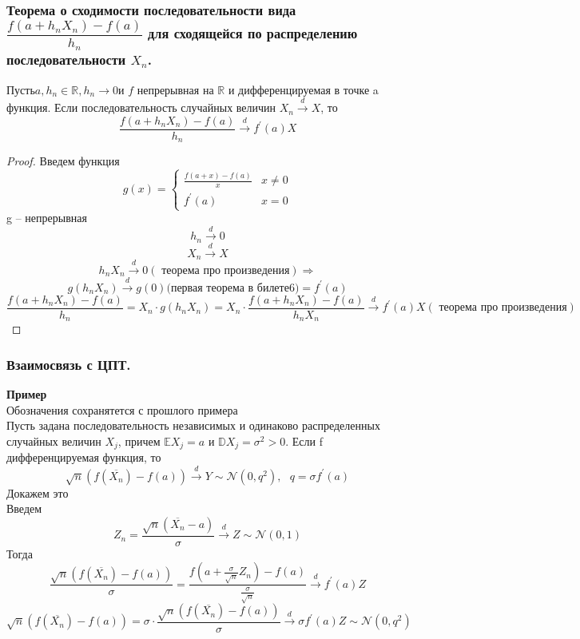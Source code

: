 	\subsubsection{Теорема о сходимости последовательности вида $\dfrac{f(a + h_n X_n) - f(a)}{h_n}$ для сходящейся по распределению последовательности $X_n$. }
	\begin{theorem*}
		Пусть$  a, h_n \in \mathbb{R}, h_n\to0 $и $ f $ непрерывная на $ \mathbb{R} $ и дифференцируемая в точке a функция. Если последовательность случайных величин $ X_n \xrightarrow{d} X $, то
		$$\frac{f(a + h_nX_n) - f(a)}{h_n}\xrightarrow{d}f^{'}(a)X$$
	\end{theorem*}
	\begin{proof}
		Введем функция
		\begin{equation*}
			g(x) = 
			\begin{cases}
				\frac{f(a + x) - f(a)}{x} & x\neq 0\\
				f^{'}(a) & x = 0
			\end{cases}
		\end{equation*}
		g -- непрерывная
		$$h_n\xrightarrow{d} 0$$
		$$X_n\xrightarrow{d}X$$
		$$h_nX_n\xrightarrow{d}0(\text{ теорема про произведения})\Rightarrow$$
		$$g(h_nX_n)\xrightarrow{d}g(0)\text{(первая теорема в билете6)} = f^{'}(a)$$
		$$\frac{f(a + h_nX_n) - f(a)}{h_n} = X_n\cdot g(h_nX_n) = X_n\cdot\frac{f(a + h_nX_n) - f(a)}{h_nX_n} \xrightarrow{d}f^{'}(a)X(\text{ теорема про произведения})$$
	\end{proof}
	\subsubsection{Взаимосвязь с ЦПТ.}
	\textbf{Пример}\\
	Обозначения сохранятется с прошлого примера\\
	Пусть задана последовательность независимых и одинаково распределенных
	случайных величин $ X_j $, причем $  \mathbb{E}X_j = a$ и $\mathbb{D}X_j = \sigma^2 > 0 $. Если f дифференцируемая функция, то
	$$\sqrt{n}(f(\overline{X_n}) - f(a))\xrightarrow{d}Y\sim\mathcal{N}(0, q^2),\text{ }q=\sigma f^{'}(a)$$
	Докажем это\\
	Введем
	$$ Z_n = \frac{\sqrt{n}(\overline{X_n} - a)}{\sigma}\xrightarrow{d}Z\sim\mathcal{N}(0,1)$$
	Тогда
	$$\frac{\sqrt{n}(f(\overline{X_n}) - f(a))}{\sigma} = \frac{f(a + \frac{\sigma}{\sqrt{n}} Z_n) - f(a)}{\frac{\sigma}{\sqrt{n}}}\xrightarrow{d}f^{'}(a)Z$$
	$$\sqrt{n}(f(\overline{X_n}) - f(a)) = \sigma \cdot \frac{\sqrt{n}(f(\overline{X_n}) - f(a))}{\sigma}\xrightarrow{d}\sigma f^{'}(a)Z\sim \mathcal{N}(0, q^2)$$